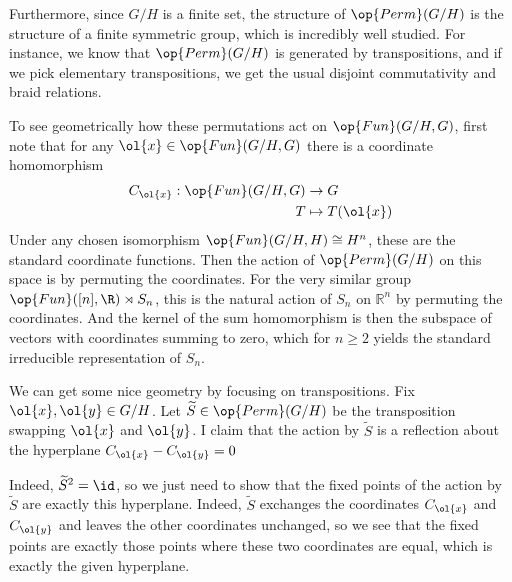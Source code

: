 \documentclass[12nt]{article}
\theoremstyle{plain}
\begin{document}
Furthermore, since $G/H$ is a finite set, the structure of $\op{Perm}(G/H)$ is the structure of a finite symmetric group, which is incredibly well studied. For instance, we know that $\op{Perm}(G/H)$ is generated by transpositions, and if we pick elementary transpositions, we get the usual disjoint commutativity and braid relations.

To see geometrically how these permutations act on $\op{Fun}(G/H, G)$, first note that for any $\ol{x} \in \op{Fun}(G/H, G)$ there is a coordinate homomorphism 
\begin{align*}
C_{\ol{x}} :  \op{Fun}(G/H, G) &\to G \\
T &\mapsto T(\ol{x})
\end{align*}
 Under any chosen isomorphism $\op{Fun}(G/H, H) \cong H^n$, these are the standard coordinate functions. Then the action of $\op{Perm}(G/H)$ on this space is by permuting the coordinates. For the very similar group $\op{Fun}([n], \R) \rtimes S_n$, this is the natural action of $S_n$ on $\mathbb{R}^n$ by permuting the coordinates. And the kernel of the sum homomorphism is then the subspace of vectors with coordinates summing to zero, which for $n \geq 2$ yields the standard irreducible representation of $S_n$. 


We can get some nice geometry by focusing on transpositions. Fix $\ol{x}, \ol{y} \in G/H$. Let $\widetilde{S} \in \op{Perm}(G/H)$ be the transposition swapping $\ol{x}$ and $\ol{y}$. I claim that the action by $\widetilde{S}$ is a reflection about the hyperplane $C_{\ol{x}} - C_{\ol{y}} = 0$

Indeed, $\widetilde{S}^2 = \id$, so we just need to show that the fixed points of the action by $\widetilde{S}$ are exactly this hyperplane. Indeed, $\widetilde{S}$ exchanges the coordinates $C_{\ol{x}}$ and $C_{\ol{y}}$ and leaves the other coordinates unchanged, so we see that the fixed points are exactly those points where these two coordinates are equal, which is exactly the given hyperplane.
\end{document}
